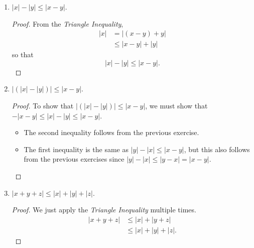 \begin{exercise}[\textbf{12}]
\begin{enumerate}
\begin{proof}
\begin{align*}
                  |x+(-y)| &\leq |x|+|-y|, \\
                  |x-y| &\leq |x|+|y|.
              \end{align*}
         \end{proof}
         \item $|x|-|y| \leq |x-y|$.
         \begin{proof} From the \emph{Triangle Inequality},
              \begin{align*}
                  |x| &= |(x-y)+y| \\
                  & \leq |x-y|+|y|
              \end{align*}
              so that
              \begin{equation*}
                  |x|-|y| \leq |x-y|.
              \end{equation*}
         \end{proof}
         \item $|(|x|-|y|)| \leq |x-y|$.
         \begin{proof} To show that $|(|x|-|y|)| \leq |x-y|$, we must show that
         $-|x-y| \leq |x|-|y| \leq |x-y|$.
              \begin{itemize}
                  \item The second inequality follows from the previous exercise. 
                  \item The first inequality is the same as $|y|-|x| \leq |x-y|$, but this
                  also follows from the previous exercises since $|y|-|x| \leq |y-x|=|x-y|$.
              \end{itemize}
         \end{proof}
         \item $|x+y+z| \leq |x|+|y|+|z|$.
         \begin{proof} We just apply the \emph{Triangle Inequality} multiple times.
              \begin{align*}
                |x+y+z| &\leq |x|+|y+z| \\
                &\leq |x|+|y|+|z|.
              \end{align*}
         \end{proof}
     \end{enumerate}
\end{exercise}
\pagebreak
